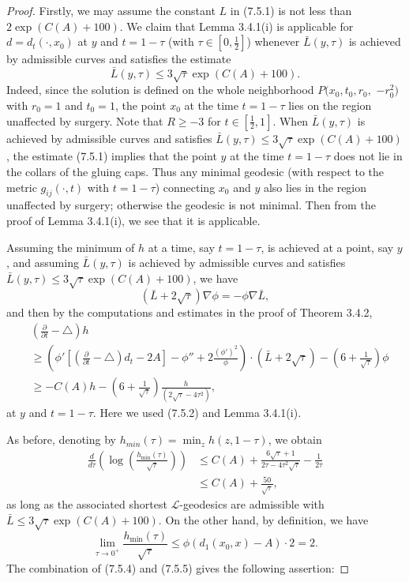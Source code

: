 \begin{proof}
Firstly,\; we\; may\; assume\; the\; constant\; $L$\; in (7.5.1)\;
is\; not\; less\; than $2\exp(C(A)+100)$. We claim that Lemma
3.4.1(i) is applicable for $d=d_t(\cdot,x_0)$ at $y$ and $
t=1-\tau $ (with $\tau\in[0,\frac{1}{2}]$) whenever
$\bar{L}(y,\tau)$ is achieved by admissible curves and satisfies
the estimate
$$
\bar{L}(y,\tau) \leq 3\sqrt{\tau}\exp(C(A)+100).
$$
Indeed, since the solution is defined on the whole neighborhood
$P(x_0,t_0,r_0,$ $-r^2_0)$ with $r_0=1$ and $t_0=1$, the point
$x_0$ at the time $t=1-\tau$ lies on the region unaffected by
surgery. Note that $R \geq -3$ for $t \in [\frac{1}{2},1]$.  When
$\bar{L}(y,\tau)$ is achieved by admissible curves and satisfies
$\bar{L}(y,\tau) \leq 3\sqrt{\tau}\exp(C(A)+100)$, the estimate
(7.5.1) implies that the point $y$ at the time $t=1-\tau$ does not
lie in the collars of the gluing caps. Thus any minimal geodesic
(with respect to the metric $g_{ij}(\cdot,t)$ with $t=1-\tau$)
connecting $x_0$ and $y$ also lies in the region unaffected by
surgery; otherwise the geodesic is not minimal.  Then from the
proof of Lemma 3.4.1(i), we see that it is applicable.

Assuming the minimum of $h$ at a time, say $t=1-\tau$, is achieved
at a point, say $y$, and assuming $\bar{L}(y,\tau)$ is achieved by
admissible curves and satisfies $\bar{L}(y,\tau) \leq
3\sqrt{\tau}\exp(C(A)+100)$, we have
$$
(\bar{L}+2\sqrt{\tau})\nabla\phi=-\phi\nabla\bar{L},
$$
and then by the computations and estimates in the proof of Theorem
3.4.2,
\begin{align*}
&\left(\frac{\partial}{\partial t}-\triangle\right)h  \\
&  \geq \left(\phi'\left[\left(\frac{\partial}{\partial
t}-\triangle\right)d_t-2A\right]-\phi''
+2\frac{(\phi')^2}{\phi}\right)\cdot(\bar{L}+2\sqrt{\tau})
-\left(6+\frac{1}{\sqrt{\tau}}\right)\phi\\
& \geq -C(A)h-\left(6+\frac{1}{\sqrt{\tau}}\right)
\frac{h}{(2\sqrt{\tau}-4\tau^2)},
\end{align*}
at $y$ and $t=1-\tau$. Here we used (7.5.2) and Lemma 3.4.1(i).

As before, denoting by $h_{min}(\tau)=\min_{z} h(z,1-\tau)$, we
obtain
\begin{align}
\frac{d}{d\tau}\left(\log\left(\frac{h_{\min}(\tau)}{\sqrt{\tau}}\right)\right) &
\leq C(A)+\frac{6\sqrt{\tau}+1}{2\tau-4\tau^2\sqrt{\tau}}
-\frac{1}{2\tau}\\
& \leq C(A)+\frac{50}{\sqrt{\tau}}, \nonumber
\end{align} %
as long as the associated shortest $\mathcal{L}$-geodesics are
admissible with $\bar{L} \leq 3\sqrt{\tau}\exp(C(A)+100)$. On the
other hand, by definition, we have \begin{equation} \lim_{\tau\rightarrow
0^+}\frac{h_{\min}(\tau)}{\sqrt{\tau}}\leq
\phi(d_1(x_0,x)-A)\cdot 2=2. %
\end{equation} The combination of (7.5.4) and (7.5.5) gives the following
assertion:


\end{proof}
